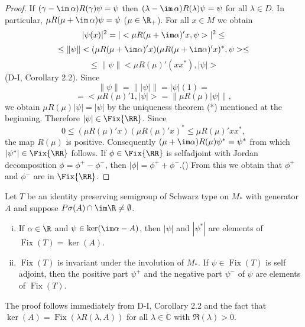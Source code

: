
\begin{proof}
If $(\gamma - \im\,\alpha)R(\gamma)\psi = \psi$ then $(\lambda - \im\,\alpha)R(\lambda)\psi = \psi$ for all $\lambda \in D$.
In particular, $\mu R(\mu + \im\,\alpha)\psi = \psi$ ($\mu \in \R_+$).
For all $x \in M$ we obtain
\[
|\psi(x)|^2 = |<\mu R(\mu+\im\alpha)'x,\psi>|^2 \leq
\]
\[
\leq \|\psi\| <(\mu R(\mu+\im\alpha)'x)(\mu R(\mu+\im\alpha)'x)^{*},\psi> \leq
\]
\[
\leq \|\psi\| <\mu R(\mu)'(xx^{*}),|\psi|>
\]
(D-I, Corollary 2.2).
Since
\[
\|\psi\| = \| |\psi| \| = |\psi|(1) =
\]
\[
= <\mu R(\mu)'1,|\psi|> = \| \mu R(\mu)|\psi| \|,
\]
we obtain $\mu R(\mu)|\psi| = |\psi|$ by the uniqueness theorem (*) mentioned at the beginning.
Therefore $|\psi| \in \Fix{\RR} $.
Since
\[
0 \leq (\mu R(\mu)'x)(\mu R(\mu)'x)^{*} \leq \mu R(\mu)'xx^{*},
\]
the map $R(\mu)$ is positive.
Consequently $(\mu+\im\alpha)R(\mu)\psi^{*} = \psi^{*}$ from which $|\psi^{*}| \in \Fix{\RR} $ follows.
If $\phi \in \Fix{\RR} $ is selfadjoint with Jordan decomposition $\phi = \phi^{+} - \phi^{-}$, then $|\phi| = \phi^{+} + \phi^{-}$.(\citet[Theorem III.4.2.]{takesaki:1979})
From this we obtain that $\phi^{+}$ and $\phi^{-}$ are in $ \Fix{\RR} $.
\end{proof}
\begin{corollary}\label{cor:d3-1.5}
Let $T$ be an identity preserving semigroup of Schwarz type on $M_*$ with generator $A$ and suppose $P\sigma(A) \cap \im\R \neq \emptyset$.

\begin{enumerate}[(i)]
\item
If $\alpha \in \R$ and $\psi \in \operatorname{ker}(\im\alpha - A)$, then $|\psi|$ and $|\psi^{*}|$ are elements of $\operatorname{Fix}(T) = \operatorname{ker}(A)$.

\item 
$\operatorname{Fix}(T)$ is invariant under the involution of $M_*$.
If $\psi \in \operatorname{Fix}(T)$ is self adjoint, then the positive part $\psi^{+}$ and the negative part $\psi^{-}$ of $\psi$ are elements of $\operatorname{Fix}(T)$.
\end{enumerate}

\end{corollary}
The proof follows immediately from D-I, Corollary 2.2 and the fact that $\operatorname{ker}(A) = \operatorname{Fix}(\lambda R(\lambda,A))$ for all $\lambda \in \mathbb{C}$ with $\Re(\lambda) > 0$.

